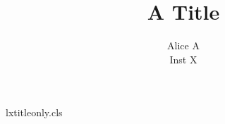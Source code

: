 \begin{filecontents*}[overwrite]{lxtitleonly.cls}
\setlength\textwidth{400pt}\setlength\textheight{600pt}
\renewcommand\normalsize{\fontsize{10}{12}\selectfont}\normalsize
\def\author#1{\gdef\@author{#1}}
\def\maketitle{\begin{center}{\@title}\end{center}}
\def\@maketitle{\begin{center}{\@title}\end{center}}
\end{filecontents*}
\documentclass{lxtitleonly}

\title{A Title}
\author{Alice A\\Inst X}
\makeatletter\g@addto@macro{}\makeatother
\maketitle
Body text.

